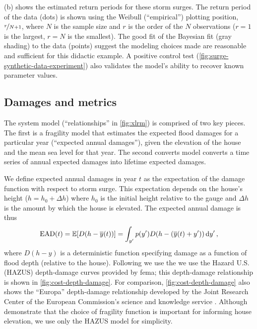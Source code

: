\documentclass[11pt]{article}
\begin{document}
(b) shows the estimated return periods for these storm surges.
The return period of the data (dots) is shown using the Weibull (``empirical'') plotting position, $\nicefrac{r}{N + 1}$, where $N$ is the sample size and $r$ is the order of the $N$ observations ($r=1$ is the largest, $r=N$ is the smallest).
The good fit of the Bayesian fit (gray shading) to the data (points) suggest the modeling choices made are reasonable and sufficient for this didactic example.
A positive control test (\cref{fig:surge-synthetic-data-experiment}) also validates the model's ability to recover known parameter values.

\subsection{Damages and metrics}\label{sec:case-metrics}

The system model (``relationships'' in \cref{fig:xlrm}) is comprised of two key pieces.
The first is a fragility model that estimates the expected flood damages for a particular year (``expected annual damages''), given the elevation of the house and the mean sea level for that year.
The second converts model converts a time series of annual expected damages into lifetime expected damages.

We define expected annual damages in year $t$ as the expectation of the damage function with respect to storm surge.
This expectation depends on the house's height ($h = h_0 + \Delta h$) where $h_0$ is the initial height relative to the gauge and $\Delta h$ is the amount by which the house is elevated.
The expected annual damage is thus
\begin{equation}\label{eq:ead}
    \textrm{EAD}(t) = \mathbb{E}[D \qty(h-\overline{y}(t))] = \int_{y'} p(y') D \qty(h - \qty(\overline{y}(t) + y')) \dd{y'},
\end{equation}
where $D(h-y)$ is a deterministic function specifying damage as a function of flood depth (relative to the house).
Following \citet{zarekarizi_suboptimal:2020} we use the we use the Hazard U.S. (HAZUS) depth-damage curves provided by \gls{fema}; this depth-damage relationship is shown in \cref{fig:cost-depth-damage}.
For comparison, \cref{fig:cost-depth-damage} also shows the ``Europa'' depth-damage relationship developed by the Joint Research Center of the European Commission's science and knowledge service \citep{huizinga_depthdamage:2016}.
Although \citet{zarekarizi_suboptimal:2020} demonstrate that the choice of fragility function is important for informing house elevation, we use only the HAZUS model for simplicity.
\end{document}

